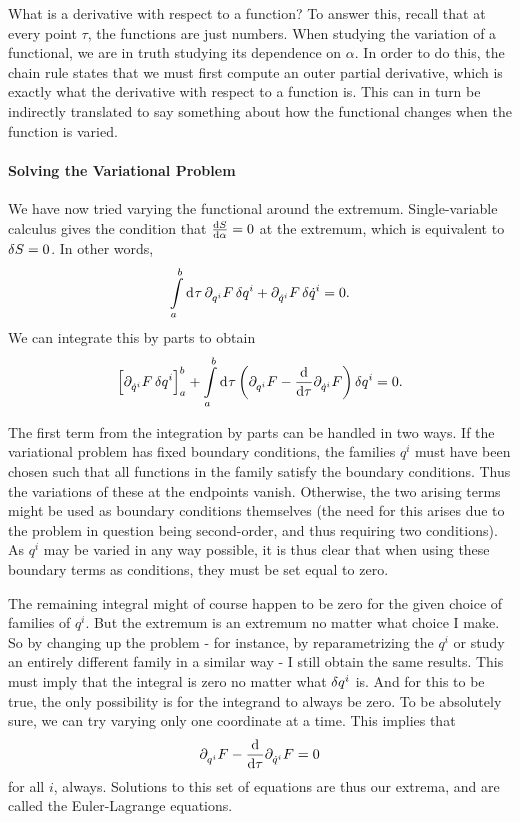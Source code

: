What is a derivative with respect to a function? To answer this, recall that at every point $\tau$, the functions are just numbers. When studying the variation of a functional, we are in truth studying its dependence on $\alpha$. In order to do this, the chain rule states that we must first compute an outer partial derivative, which is exactly what the derivative with respect to a function is. This can in turn be indirectly translated to say something about how the functional changes when the function is varied.

\paragraph{Solving the Variational Problem}
We have now tried varying the functional around the extremum. Single-variable calculus gives the condition that $\dv{S}{\alpha} = 0$ at the extremum, which is equivalent to $\var{S} = 0$. In other words,
\begin{align*}
	\int\limits_{a}^{b}\dd[]{\tau}\partial^{}_{q^{i}}F\var{q^{i}} + \partial^{}_{\dot{q}^{i}}F\var{\dot{q}^{i}} = 0.
\end{align*}
We can integrate this by parts to obtain
\begin{align*}
	\left[\partial^{}_{\dot{q}^{i}}F\var{q^{i}}\right]_{a}^{b} + \int\limits_{a}^{b}\dd[]{\tau}\left(\partial^{}_{q^{i}}F - \dv{\tau}\partial^{}_{\dot{q}^{i}}F\right)\var{q^{i}} = 0.
\end{align*}

The first term from the integration by parts can be handled in two ways. If the variational problem has fixed boundary conditions, the families $q^{i}$ must have been chosen such that all functions in the family satisfy the boundary conditions. Thus the variations of these at the endpoints vanish. Otherwise, the two arising terms might be used as boundary conditions themselves (the need for this arises due to the problem in question being second-order, and thus requiring two conditions). As $q^{i}$ may be varied in any way possible, it is thus clear that when using these boundary terms as conditions, they must be set equal to zero.

The remaining integral might of course happen to be zero for the given choice of families of $q^{i}$. But the extremum is an extremum no matter what choice I make. So by changing up the problem - for instance, by reparametrizing the $q^{i}$ or study an entirely different family in a similar way - I still obtain the same results. This must imply that the integral is zero no matter what $\var{q^{i}}$ is. And for this to be true, the only possibility is for the integrand to always be zero. To be absolutely sure, we can try varying only one coordinate at a time. This implies that
\begin{align*}
	\partial^{}_{q^{i}}F - \dv{\tau}\partial^{}_{\dot{q}^{i}}F = 0
\end{align*}
for all $i$, always. Solutions to this set of equations are thus our extrema, and are called the Euler-Lagrange equations.

